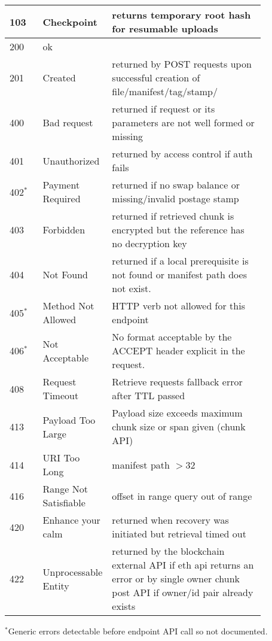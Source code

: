 \begin{definition}
\begin{lstlisting}
\end{lstlisting}
\begin{tabular}{l|p{0.25\linewidth}|p{0.6\linewidth}}
103 & Checkpoint & returns temporary root hash for resumable uploads
\\\hline
200 & ok &
\\
201 & Created & returned by POST requests upon successful creation of file/manifest/tag/stamp/
\\\hline
400 & Bad request & returned if request or its parameters are not well formed or missing
\\
401 & Unauthorized & returned by access control if auth fails
\\
402$^{*}$ & Payment Required & returned if no swap balance or missing/invalid postage stamp
\\
403 & Forbidden & returned if retrieved chunk is encrypted  but the reference has no decryption key
\\     
404 & Not Found &
returned if a local prerequisite is not found or manifest path does not exist.
\\
405$^{*}$& Method Not Allowed & HTTP verb  not allowed for this endpoint
\\
406$^{*}$
%
& Not Acceptable & No format acceptable by the {ACCEPT} header explicit in the request. 
\\
408 & Request Timeout & Retrieve requests fallback error after TTL passed
\\
413 & Payload Too Large  &
Payload size exceeds maximum chunk size or span given (chunk API)
\\
414 & URI Too Long  & manifest path  $>32 $
\\
416 & Range Not Satisfiable  & offset in range query out of range
\\
420 & Enhance your calm & returned when recovery was initiated but retrieval timed out
\\
422 & Unprocessable Entity & returned by the blockchain external API if eth api returns an error or by single owner chunk post API if owner/id pair already exists
\end{tabular}

\footnotesize{$^{*}$Generic errors detectable before endpoint API call so not documented.}
\end{definition}



